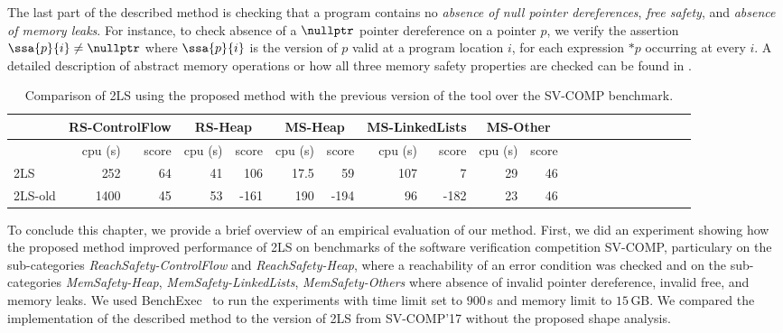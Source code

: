 {The last part of the described method is checking that
a program contains no \emph{absence of null pointer dereferences},
\emph{free safety}, and \emph{absence of memory leaks}.
For instance, to check absence of a $\nullptr$ pointer dereference on a pointer $p$, we verify the assertion
$\ssa{p}{i} \neq \nullptr$ where $\ssa{p}{i}$ is the version of $p$
valid at a program location $i$, for each expression $*p$ occurring at every $i$.
A detailed description of abstract memory operations or how all three memory safety properties are checked
can be found in \cite{fmcad18}.

\begin{table}[t]
\captionsetup{font=small}
\caption{Comparison of 2LS using the proposed method with the previous version of the tool over the SV-COMP benchmark.}
\vspace*{-1mm}
\label{tab:2ls-old}
\centering
\scriptsize
\bgroup
\def\arraystretch{1.2}
\begin{tabular}{|l| r | r | r | r | r | r | r | r | r | r | r | r | r | r | r | r | r | r | r | r |}
\hline
& \multicolumn{2}{c|}{\textbf{RS-ControlFlow}}  & \multicolumn{2}{c|}{\textbf{RS-Heap}} & \multicolumn{2}{c|}{\textbf{MS-Heap}} & \multicolumn{2}{c|}{\textbf{MS-LinkedLists}} & \multicolumn{2}{c|}{\textbf{MS-Other}}\\\hline
        & cpu (s) & score & cpu (s) & score & cpu (s) & score & cpu (s) & score & cpu (s) & score \\\hline
 2LS     & 252  & 64 & 41    & 106  & 17.5 & 59   & 107  & 7    & 29 & 46\\\hline
2LS-old & 1400 & 45 & 53  & -161 & 190 & -194 & 96 & -182 & 23 & 46\\\hline
\end{tabular}
\egroup
\end{table}

To conclude this chapter, we provide a brief overview of an empirical evaluation of our method.
First, we did an experiment showing how the proposed method improved performance of 2LS
on benchmarks of the software verification competition SV-COMP,
particulary on the sub-categories \emph{ReachSafety-ControlFlow} and \emph{ReachSafety-Heap},
where a reachability of an error condition was checked and on the sub-categories
\emph{MemSafety-Heap}, \emph{MemSafety-LinkedLists}, \emph{MemSafety-Others}
where absence of invalid pointer dereference,
invalid free, and memory leaks.
We used BenchExec~\cite{BLW15} to run the experiments with
time limit set to $900$\,s and memory limit to $15$\,GB.
We compared the implementation of the described method to the version of 2LS from SV-COMP'17 without
the proposed shape analysis.

}
